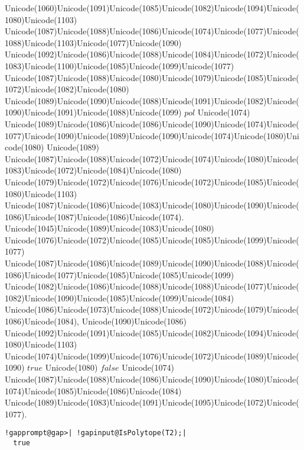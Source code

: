 \documentclass[a4paper,11pt]{report}
\begin{document}
{{{ Unicode(1060)Unicode(1091)Unicode(1085)Unicode(1082)Unicode(1094)Unicode(1080)Unicode(1103)
Unicode(1087)Unicode(1088)Unicode(1086)Unicode(1074)Unicode(1077)Unicode(1088)Unicode(1103)Unicode(1077)Unicode(1090)
Unicode(1092)Unicode(1086)Unicode(1088)Unicode(1084)Unicode(1072)Unicode(1083)Unicode(1100)Unicode(1085)Unicode(1099)Unicode(1077)
Unicode(1087)Unicode(1088)Unicode(1080)Unicode(1079)Unicode(1085)Unicode(1072)Unicode(1082)Unicode(1080)
Unicode(1089)Unicode(1090)Unicode(1088)Unicode(1091)Unicode(1082)Unicode(1090)Unicode(1091)Unicode(1088)Unicode(1099) $pol$ Unicode(1074)
Unicode(1089)Unicode(1086)Unicode(1086)Unicode(1090)Unicode(1074)Unicode(1077)Unicode(1090)Unicode(1089)Unicode(1090)Unicode(1074)Unicode(1080)Unicode(1080)
Unicode(1089)
Unicode(1087)Unicode(1088)Unicode(1072)Unicode(1074)Unicode(1080)Unicode(1083)Unicode(1072)Unicode(1084)Unicode(1080)
Unicode(1079)Unicode(1072)Unicode(1076)Unicode(1072)Unicode(1085)Unicode(1080)Unicode(1103)
Unicode(1087)Unicode(1086)Unicode(1083)Unicode(1080)Unicode(1090)Unicode(1086)Unicode(1087)Unicode(1086)Unicode(1074).
Unicode(1045)Unicode(1089)Unicode(1083)Unicode(1080)
Unicode(1076)Unicode(1072)Unicode(1085)Unicode(1085)Unicode(1099)Unicode(1077)
Unicode(1087)Unicode(1086)Unicode(1089)Unicode(1090)Unicode(1088)Unicode(1086)Unicode(1077)Unicode(1085)Unicode(1085)Unicode(1099)
Unicode(1082)Unicode(1086)Unicode(1088)Unicode(1088)Unicode(1077)Unicode(1082)Unicode(1090)Unicode(1085)Unicode(1099)Unicode(1084)
Unicode(1086)Unicode(1073)Unicode(1088)Unicode(1072)Unicode(1079)Unicode(1086)Unicode(1084),
Unicode(1090)Unicode(1086)
Unicode(1092)Unicode(1091)Unicode(1085)Unicode(1082)Unicode(1094)Unicode(1080)Unicode(1103)
Unicode(1074)Unicode(1099)Unicode(1076)Unicode(1072)Unicode(1089)Unicode(1090) $true$ Unicode(1080) $false$ Unicode(1074)
Unicode(1087)Unicode(1088)Unicode(1086)Unicode(1090)Unicode(1080)Unicode(1074)Unicode(1085)Unicode(1086)Unicode(1084)
Unicode(1089)Unicode(1083)Unicode(1091)Unicode(1095)Unicode(1072)Unicode(1077). 
\begin{Verbatim}[commandchars=!@|,fontsize=\small,frame=single,label=Пример]
  !gapprompt@gap>| !gapinput@IsPolytope(T2);|
  true
  				

\end{Verbatim}}}}
\end{document}
